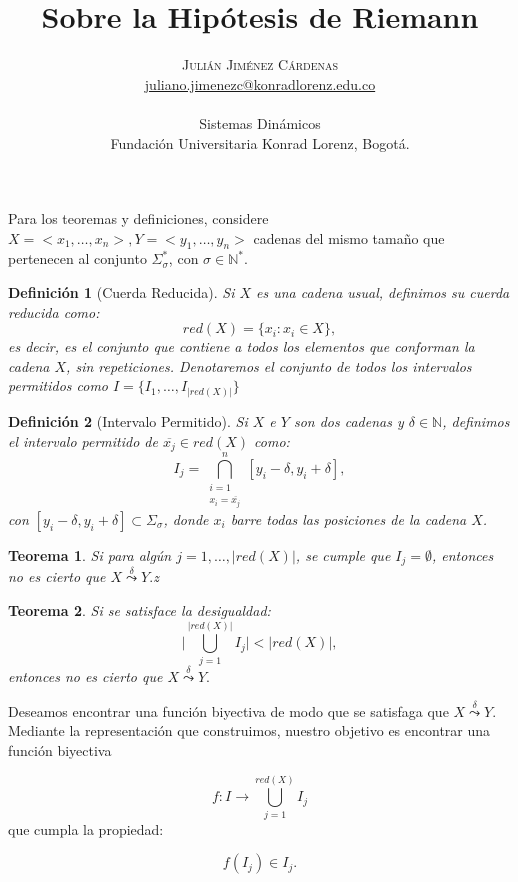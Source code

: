 \documentclass[twocolumn]{article}
\title{Sobre la Hipótesis de Riemann} %
\author{%
\textsc{Julián Jiménez Cárdenas} \\[1ex] %
\normalsize \href{mailto:juliano.jimenezc@konradlorenz.edu.co}{juliano.jimenezc@konradlorenz.edu.co} %
\\ \\ \normalsize{Sistemas Dinámicos}
\\ \normalsize{Fundación Universitaria Konrad Lorenz, Bogotá.} %
}
\date{} %
\newtheorem{theorem}{Teorema}
\newtheorem{definition}{Definición}
\begin{document}
Para los teoremas y definiciones, considere $X=<x_1,\dots,x_n>,Y=<y_1,\dots,y_n>$ cadenas del mismo tamaño que pertenecen al conjunto $\Sigma_\sigma^*$, con $\sigma\in\mathbb{N^*}$. 
\begin{definition}[Cuerda Reducida]
Si $X$ es una cadena usual, definimos su cuerda reducida como:
\begin{equation}
	red(X)=\{x_i: x_i\in X\},
\end{equation}
es decir, es el conjunto que contiene a todos los elementos que conforman la cadena $X$, sin repeticiones. Denotaremos el conjunto de todos los intervalos permitidos como $I=\{I_1,\dots,I_{|red(X)|}\}$
\end{definition}


\begin{definition}[Intervalo Permitido]
Si $X$ e $Y$ son dos cadenas y $\delta\in\mathbb{N}$, definimos el intervalo permitido de $\overline{x_j}\in red(X)$ como:
\begin{equation}
	I_j=\bigcap\limits_{\substack{i=1 \\ x_i=\overline{x_j}}}^n [y_i-\delta,y_i+\delta],
\end{equation}
con $[y_i-\delta,y_i+\delta]\subset\Sigma_\sigma$, donde $x_i$ barre todas las posiciones de la cadena $X$.
\end{definition}

\begin{theorem}
Si para algún $j=1,\dots,|red(X)|$, se cumple que $I_j=\emptyset$, entonces no es cierto que $X\overset{\delta}{\leadsto} Y.$z
\end{theorem}

\begin{theorem}
Si se satisface la desigualdad:
\begin{equation}
\Big|\bigcup\limits_{j=1}^{|red(X)|} I_j\Big|<|red(X)|,
\end{equation}
entonces no es cierto que $X\overset{\delta}{\leadsto} Y.$
\end{theorem}

Deseamos encontrar una función biyectiva de modo que se satisfaga que $X\overset{\delta}{\leadsto} Y.$ Mediante la representación que construimos, nuestro objetivo es encontrar una función biyectiva

$$f:I\rightarrow \bigcup\limits_{j=1}^{red(X)}I_j$$
que cumpla la propiedad:

$$f(I_j)\in I_j.$$
\end{document}
